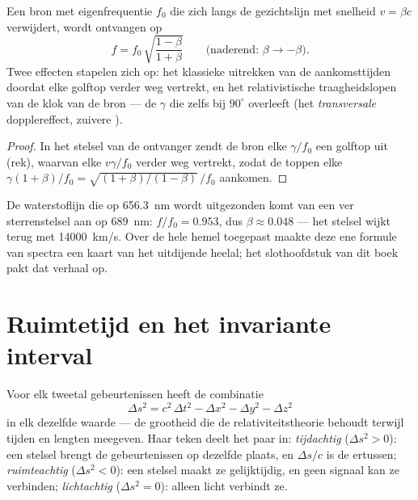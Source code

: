 \begin{proposition}\label{prop:b3:relativistic-kinematics:doppler}
Een bron met eigenfrequentie $f_0$ die zich langs de gezichtslijn met
snelheid $v = \beta c$ verwijdert, wordt ontvangen op
\[
f = f_0\,\sqrt{\frac{1 - \beta}{1 + \beta}}
\qquad
\text{(naderend: } \beta \to -\beta\text{)} .
\]
Twee effecten stapelen zich op: het klassieke uitrekken van de
aankomsttijden doordat elke golftop verder weg vertrekt, en het
relativistische traagheidslopen van de klok van de bron --- de $\gamma$
die zelfs bij $90^\circ$ overleeft (het \emph{transversale}
dopplereffect, zuivere ).
\end{proposition}

\begin{proof}
In het stelsel van de ontvanger zendt de bron elke $\gamma/f_0$ een
golftop uit (rek), waarvan elke $v\gamma/f_0$ verder weg vertrekt, zodat
de toppen elke $\gamma(1 + \beta)/f_0 = \sqrt{(1+\beta)/
(1-\beta)}\,/f_0$ aankomen.
\end{proof}

\begin{example}\label{ex:b3:relativistic-kinematics:redshift}
De waterstoflijn die op \qty{656.3}{nm} wordt uitgezonden komt van een ver
sterrenstelsel aan op \qty{689}{nm}: $f/f_0 = 0.953$, dus $\beta \approx 0.048$ --- het stelsel wijkt terug met \qty{14000}{km/s}. Over de hele
hemel toegepast maakte deze ene formule van spectra een kaart van het
uitdijende heelal; het slothoofdstuk van dit boek pakt dat verhaal op.
\end{example}

\section{Ruimtetijd en het invariante interval}

\begin{theorem}\label{thm:b3:relativistic-kinematics:interval}
Voor elk tweetal gebeurtenissen heeft de combinatie
\[
\Delta s^2 = c^2\,\Delta t^2 - \Delta x^2 - \Delta y^2 - \Delta z^2
\]
in elk  dezelfde waarde --- de grootheid die de
relativiteitstheorie behoudt terwijl tijden en lengten meegeven. Haar
teken deelt het paar in: \emph{tijdachtig} ($\Delta s^2 > 0$): een
stelsel brengt de gebeurtenissen op dezelfde plaats, en $\Delta s/c$ is
de  ertussen; \emph{ruimteachtig} ($\Delta s^2 < 0$): een
stelsel maakt ze gelijktijdig, en geen signaal kan ze verbinden;
\emph{lichtachtig} ($\Delta s^2 = 0$): alleen licht verbindt ze.
\end{theorem}


